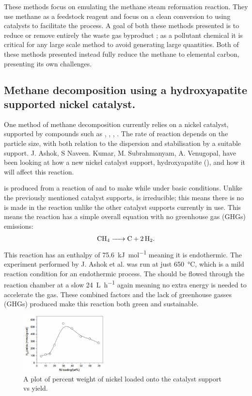 These methods focus on emulating the methane steam reformation reaction. 
They use methane as a feedstock reagent and focus on a clean conversion to  using catalysts to facilitate the process.
A goal of both these methods presented is to reduce or remove entirely the waste gas byproduct ; as a pollutant chemical it is critical for any large scale method to avoid generating large quantities.
Both of these methods presented instead fully reduce the methane to elemental carbon, presenting its own challenges.

\subsection{Methane decomposition using a hydroxyapatite supported nickel catalyst.}%
\label{sub:methane_decomposition_using_a_hydroxyapatite_supported_nickel_catalyst_}
One method of methane decomposition currently relies on a nickel catalyst, supported by compounds such as , , , .
The rate of reaction depends on the  particle size, with both relation to the dispersion and stabilisation by a suitable support\cite{Ashok}.
 J. Ashok, S Naveen. Kumar, M. Subrahmanyam, A. Venugopal, have been looking at how a new nickel catalyst support, hydroxyapatite (), and how it will affect this reaction.

  is produced from a reaction of  and  to make \ce{[Ca5(PO4)3(OH)]} while under basic conditions\cite{Ashok}.
Unlike the previously mentioned catalyst supports,  is irreducible; this means there is no  is made in the reaction unlike the other catalyst supports currently in use.
This means the reaction has a simple overall equation with no greenhouse gas (GHGs) emissions:
\begin{align}
	\ce{CH4 -> C +2H2}
.\end{align}
This reaction has an enthalpy of \SI{75.6}{\kilo\joule\per\mole} meaning it is endothermic.
The experiment performed by J. Ashok et al. was run at just \SI{650}{\celsius}\cite{Ashok}, which is a mild reaction condition for an endothermic process.
The  should be flowed through the reaction chamber at a slow \SI{24}{\liter\per\hour}\cite{Ashok} again meaning no extra energy is needed to accelerate the gas.
These combined factors and the lack of greenhouse gasses (GHGs) produced make this reaction both green and sustainable.

\begin{figure}[H]
	\centering
	\includegraphics[width=0.4\textwidth]{539a7840-2cb8-11eb-895f-8c8590753a48.png}
	\caption{A plot of percent weight of nickel loaded onto the catalyst support vs  yield.}  
	\label{fig:MD_plot1}
\end{figure}

